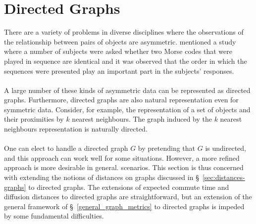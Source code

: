 \documentclass[10pt,twocolumn]{article}
\numberwithin{equation}{section}
\begin{document}
\section{Directed Graphs}
\label{sec:dist-direct-graphs}
There are a variety of problems in diverse disciplines where the
observations of the relationship between pairs of objects are
asymmetric. \cite{rothkopf57} mentioned a study where a number of
subjects were asked whether two Morse codes that were played in
sequence are identical and it was observed that the order in which the
sequences were presented play an important part in the subjects'
responses. \\ \\
\noindent
A large number of these kinds of asymmetric data can be represented as
directed graphs. Furthermore, directed graphs are also natural
representation even for symmetric data. Consider, for example, the
representation of a set of objects and their proximities by $k$
nearest neighbours. The graph induced by the $k$ nearest neighbours
representation is naturally directed. \\ \\
%
\noindent
One can elect to handle a directed graph $G$ by pretending that $G$ is
undirected, and this approach can work well for some situations.
However, a more refined approach is more desirable in general.
scenarios.  This section is thus concerned with extending the notions of
distances on graphs discussed in \S~\ref{sec:distances-graphs} to
directed graphs. The extensions of expected commute time and diffusion
distances to directed graphs are straightforward, but an extension of
the general framework of \S~\ref{general_graph_metrics} to directed
graphs is impeded by some fundamental difficulties. 
\end{document}
